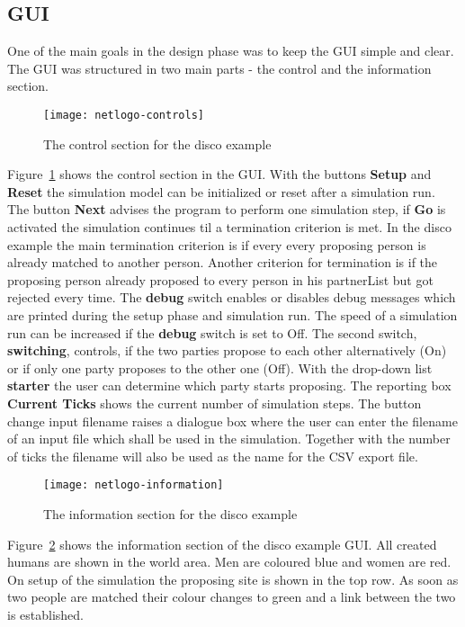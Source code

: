 \subsection{GUI}
One of the main goals in the design phase was to keep the GUI simple and clear.
The GUI was structured in two main parts - the control and the information section.
\begin{figure}[H]
  \caption{The control section for the disco example}
	\label{fig:control-disco-gui}
  \centering
    \texttt{[image: netlogo-controls]}
\end{figure}
Figure~\ref{fig:control-disco-gui} shows the control section in the GUI. 
With the buttons \textbf{Setup} and \textbf{Reset} the simulation model can be initialized or reset after a simulation run.
The button \textbf{Next} advises the program to perform one simulation step, if \textbf{Go} is activated the simulation continues til a termination criterion is met.
In the disco example the main termination criterion is if every every proposing person is already matched to another person. 
Another criterion for termination is if the proposing person already proposed to every person in his partnerList but got rejected every time.
The \textbf{debug} switch enables or disables debug messages which are printed during the setup phase and simulation run.
The speed of a simulation run can be increased if the \textbf{debug} switch is set to Off.
The second switch, \textbf{switching}, controls, if the two parties propose to each other alternatively (On) or if only one party proposes to the other one (Off).
With the drop-down list \textbf{starter} the user can determine which party starts proposing.
The reporting box \textbf{Current Ticks} shows the current number of simulation steps.
The button change input filename raises a dialogue box where the user can enter the filename of an input file which shall be used in the simulation.
Together with the number of ticks the filename will also be used as the name for the CSV export file.
\begin{figure}[H]
  \caption{The information section for the disco example}
	\label{fig:info-disco-gui}
  \centering
    \texttt{[image: netlogo-information]}
\end{figure}
Figure~\ref{fig:info-disco-gui} shows the information section of the disco example GUI. 
All created humans are shown in the world area. 
Men are coloured blue and women are red.
On setup of the simulation the proposing site is shown in the top row. 
As soon as two people are matched their colour changes to green and a link between the two is established.
